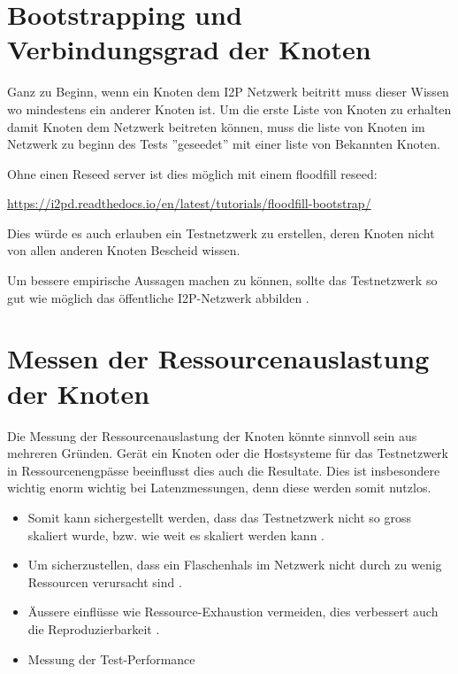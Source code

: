 
\section{Bootstrapping und Verbindungsgrad der Knoten}

Ganz zu Beginn, wenn ein Knoten dem I2P Netzwerk beitritt muss dieser Wissen wo mindestens ein anderer Knoten ist.
Um die erste Liste von Knoten zu erhalten damit Knoten dem Netzwerk beitreten können, muss die liste von Knoten im Netzwerk zu beginn des Tests ''geseedet'' mit einer liste von Bekannten Knoten.

Ohne einen Reseed server ist dies möglich mit einem floodfill reseed:

\url{https://i2pd.readthedocs.io/en/latest/tutorials/floodfill-bootstrap/}

Dies würde es auch erlauben ein Testnetzwerk zu erstellen, deren Knoten nicht von allen anderen Knoten Bescheid wissen.


Um bessere empirische Aussagen machen zu können, sollte das Testnetzwerk so gut wie möglich das öffentliche I2P-Netzwerk abbilden .


\section{Messen der Ressourcenauslastung der Knoten}


Die Messung der Ressourcenauslastung der Knoten könnte sinnvoll sein aus mehreren Gründen.
Gerät ein Knoten oder die Hostsysteme für das Testnetzwerk in Ressourcenengpässe beeinflusst dies auch die Resultate.
Dies ist insbesondere wichtig enorm wichtig bei Latenzmessungen, denn diese werden somit nutzlos.

\begin{itemize}
    \item Somit kann sichergestellt werden, dass das Testnetzwerk nicht so gross skaliert wurde, bzw. wie weit es skaliert werden kann .
    \item Um sicherzustellen, dass ein Flaschenhals im Netzwerk nicht durch zu wenig Ressourcen verursacht sind .
    \item Äussere einflüsse wie Ressource-Exhaustion vermeiden, dies verbessert auch die Reproduzierbarkeit .
    \item Messung der Test-Performance
\end{itemize}

